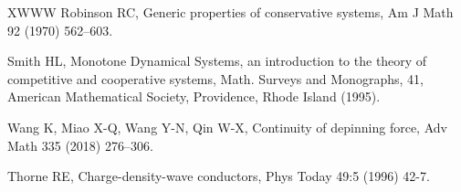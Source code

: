\documentclass[12pt]{article}
\begin{document}
\begin{thebibliography}{XWWW}
 Robinson RC, Generic properties of conservative systems, Am J Math 92 (1970) 562--603.

 Smith HL, Monotone Dynamical Systems, an introduction to the theory of competitive and cooperative systems, Math. Surveys and Monographs, 41, American
Mathematical Society, Providence, Rhode Island (1995).


 Wang K, Miao X-Q, Wang Y-N, Qin W-X, Continuity of depinning force, Adv Math 335 (2018) 276--306.

  Thorne RE, Charge-density-wave conductors, Phys Today 49:5 (1996) 42-7.

\end{thebibliography}
\end{document}
